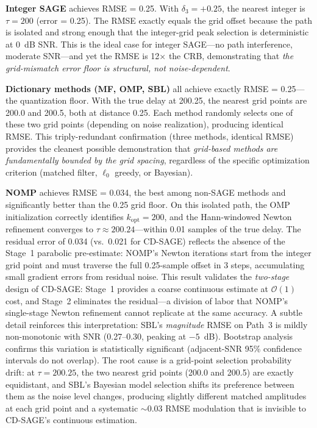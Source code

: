 \documentclass[a4paper,fleqn]{cas-dc}
\begin{document}
\textbf{Integer SAGE} achieves RMSE = 0.25. With $\delta_3 = +0.25$, the nearest integer is $\tau = 200$ (error = 0.25). The RMSE exactly equals the grid offset because the path is isolated and strong enough that the integer-grid peak selection is deterministic at 0~dB SNR. This is the ideal case for integer SAGE---no path interference, moderate SNR---and yet the RMSE is 12$\times$ the CRB, demonstrating that \textit{the grid-mismatch error floor is structural, not noise-dependent}.

\textbf{Dictionary methods (MF, OMP, SBL)} all achieve exactly RMSE = 0.25---the quantization floor. With the true delay at 200.25, the nearest grid points are 200.0 and 200.5, both at distance 0.25. Each method randomly selects one of these two grid points (depending on noise realization), producing identical RMSE. This triply-redundant confirmation (three methods, identical RMSE) provides the cleanest possible demonstration that \textit{grid-based methods are fundamentally bounded by the grid spacing}, regardless of the specific optimization criterion (matched filter, $\ell_0$ greedy, or Bayesian).

\textbf{NOMP} achieves RMSE = 0.034, the best among non-SAGE methods and significantly better than the 0.25 grid floor. On this isolated path, the OMP initialization correctly identifies $k_{\text{opt}} = 200$, and the Hann-windowed Newton refinement converges to $\tau \approx 200.24$---within 0.01 samples of the true delay. The residual error of 0.034 (vs.\ 0.021 for CD-SAGE) reflects the absence of the Stage~1 parabolic pre-estimate: NOMP's Newton iterations start from the integer grid point and must traverse the full 0.25-sample offset in 3 steps, accumulating small gradient errors from residual noise. This result validates the \textit{two-stage} design of CD-SAGE: Stage~1 provides a coarse continuous estimate at $\mathcal{O}(1)$ cost, and Stage~2 eliminates the residual---a division of labor that NOMP's single-stage Newton refinement cannot replicate at the same accuracy. A subtle detail reinforces this interpretation: SBL's \textit{magnitude} RMSE on Path~3 is mildly non-monotonic with SNR (0.27--0.30, peaking at $-5$~dB). Bootstrap analysis confirms this variation is statistically significant (adjacent-SNR 95\% confidence intervals do not overlap). The root cause is a grid-point selection probability drift: at $\tau=200.25$, the two nearest grid points (200.0 and 200.5) are exactly equidistant, and SBL's Bayesian model selection shifts its preference between them as the noise level changes, producing slightly different matched amplitudes at each grid point and a systematic $\sim$0.03 RMSE modulation that is invisible to CD-SAGE's continuous estimation.
\end{document}
